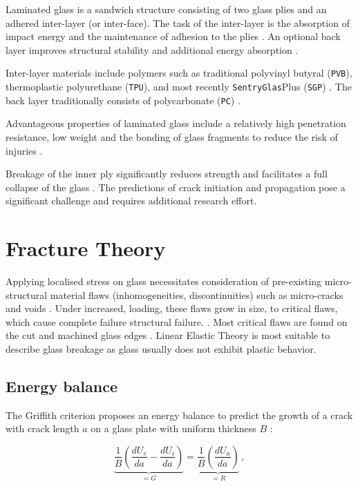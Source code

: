 \documentclass[format=acmsmall, 12pt, screen=true, review=false]{acmart}
\begin{document}
Laminated glass is a sandwich structure consisting of two glass plies and an adhered inter-layer (or inter-face). The task of the inter-layer is the absorption of impact energy and the maintenance of adhesion to the plies \cite{Wu14}. An optional back layer improves structural stability and additional energy absorption \cite{Bio10, Bra10}.

\bigbreak
Inter-layer materials include polymers such as traditional polyvinyl butyral (\texttt{PVB}), thermoplastic polyurethane (\texttt{TPU}), and most recently \texttt{SentryGlas}\textregistered Plus (\texttt{SGP}) \cite{Moh18, Wan18}. The back layer traditionally consists of polycarbonate (\texttt{PC}) \cite{Mon04, Bra10}.

\bigbreak
Advantageous properties of laminated glass include a relatively high penetration resistance, low weight \cite{Wu14} and the bonding of glass fragments to reduce the risk of injuries \cite{Che17, Flo98, Ji98}. 

\bigbreak
Breakage of the inner ply significantly reduces strength and facilitates a full collapse of the glass \cite{Flo98}. The predictions of crack initiation and propagation pose a significant challenge and requires additional research effort.

\section{Fracture Theory}

Applying localised stress on glass necessitates consideration of pre-existing micro-structural material flaws (inhomogeneities, discontinuities) such as micro-cracks and voids \cite{Sch12}. Under increased, loading, these flaws grow in size, to critical flaws, which cause complete failure structural failure. \cite{Flo98, Pel16}. Most critical flaws are found on the cut and machined glass edges \cite{Pel16}. Linear Elastic Theory is most suitable to describe glass breakage as glass usually does not exhibit plastic behavior.

\subsection{Energy balance}

The Griffith criterion \cite{Sch12, And05} proposes an energy balance to predict the growth of a crack with crack length $a$ on a glass plate with uniform thickness $B$ :  

\begin{equation}
    \label{eq:GrifCrit}
    \underbrace{\frac{1}{B}\left(\frac{dU_e}{da}-\frac{dU_i}{da}\right)}_{=G}=\underbrace{\frac{1}{B}\left(\frac{dU_a}{da}\right)}_{=R}\,,
\end{equation}
\end{document}
